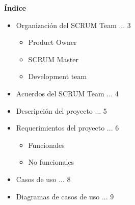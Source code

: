 \documentclass[12pt,letterpaper]{article}
\begin{document}
{\begin{center}
			\par\vspace{3cm}

		\end{center}
		\clearpage
	}

	\newpage
	\pagestyle{plain}
	{
		\begin{center}
			\par\vspace{0.5cm}
			{
				\Huge\textbf
				{
					\'Indice
				}
			}
		\end{center}
					\begin{itemize}
						\item Organización del SCRUM Team ... 3
                        \begin{itemize}
                            \item Product Owner
                            \item SCRUM Master
                            \item Development team
                        \end{itemize}
						\item Acuerdos del SCRUM Team ... 4
						\item Descripción del proyecto ... 5
						\item Requerimientos del proyecto ... 6
                            \begin{itemize}
                                \item Funcionales
                                \item No funcionales
                            \end{itemize}
                        \item Casos de uso ... 8
                        \item Diagramas de casos de uso ... 9
					\end{itemize}

			\vfill
	}
\end{document}
